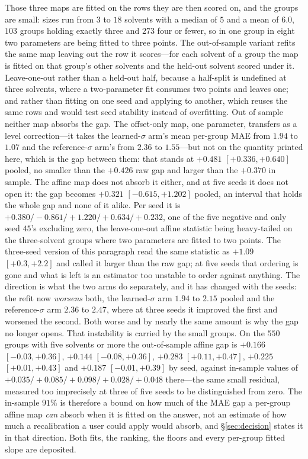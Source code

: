 Those three maps are fitted on the rows they are then scored on, and the groups are small: sizes run
from $3$ to $18$ solvents with a median of $5$ and a mean of $6.0$, $103$ groups holding exactly
three and $273$ four or fewer, so in one group in eight two parameters are being fitted to three
points. The out-of-sample variant refits the same map leaving out the row it scores---for each
solvent of a group the map is fitted on that group's other solvents and the held-out solvent scored
under it. Leave-one-out rather than a held-out half, because a half-split is undefined at three
solvents, where a two-parameter fit consumes two points and leaves one; and rather than fitting on
one seed and applying to another, which reuses the same rows and would test seed stability instead of
overfitting. Out of sample neither map absorbs the gap. The offset-only map, one parameter,
transfers as a level correction---it takes the learned-$\sigma$ arm's mean per-group MAE from
$1.94$ to $1.07$ and the reference-$\sigma$ arm's from $2.36$ to $1.55$---but not on the quantity
printed here, which is the gap between them: that stands at $+0.481$ $[+0.336,+0.640]$ pooled, no
smaller than the $+0.426$ raw gap and larger than the $+0.370$ in sample. The affine map does not
absorb it either, and at five seeds it does not open it: the gap becomes $+0.321$
$[-0.615,+1.202]$ pooled, an interval that holds the whole gap and none of it alike. Per seed it is
$+0.380/{-}0.861/{+}1.220/{+}0.634/{+}0.232$, one of the five negative and only seed $45$'s excluding
zero, the leave-one-out affine statistic being heavy-tailed on the three-solvent groups where two
parameters are fitted to two points. The three-seed version of this paragraph read the same
statistic as $+1.09$ $[+0.3,+2.2]$ and called it larger than the raw gap; at five seeds that
ordering is gone and what is left is an estimator too unstable to order against anything.
The direction is what the two arms do separately, and it has changed with the seeds: the refit now
\emph{worsens} both, the learned-$\sigma$ arm $1.94$ to $2.15$ pooled and the reference-$\sigma$ arm
$2.36$ to $2.47$, where at three seeds it improved the first and worsened the second. Both worse and
by nearly the same amount is why the gap no longer opens. That
instability is carried by the small groups. On the $550$ groups with five solvents or more the
out-of-sample affine gap is $+0.166$ $[-0.03,+0.36]$, $+0.144$ $[-0.08,+0.36]$, $+0.283$
$[+0.11,+0.47]$, $+0.225$ $[+0.01,+0.43]$ and $+0.187$ $[-0.01,+0.39]$ by seed, against in-sample
values of $+0.035/{+}0.085/{+}0.098/{+}0.028/{+}0.048$ there---the same small
residual, measured too imprecisely at three of five seeds to be distinguished from zero. The in-sample
$91\%$ is therefore a bound on how much of the MAE gap a per-group affine map \emph{can} absorb when
it is fitted on the answer, not an estimate of how much a recalibration a user could apply would
absorb, and \S\ref{sec:decision} states it in that direction. Both fits, the ranking, the floors and
every per-group fitted slope are deposited.

